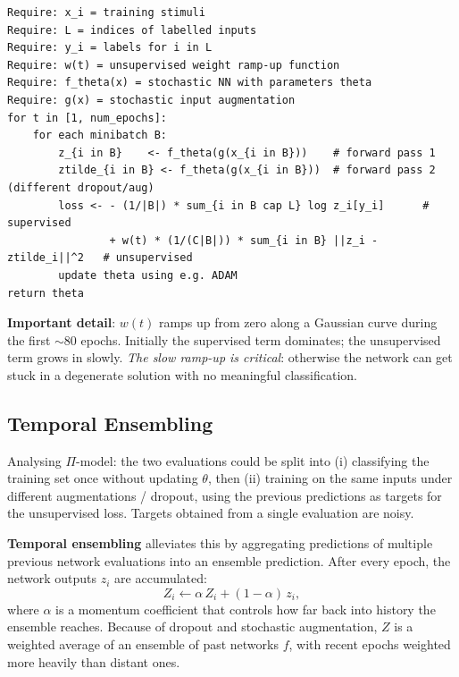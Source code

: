 \documentclass[11pt,a4paper]{article}
\theoremstyle{definition}
\theoremstyle{plain}
\theoremstyle{remark}
\begin{document}
\begin{tcolorbox}[colback=gray!5!white,colframe=gray!60!black,title=\textbf{Algorithm 1: $\Pi$-Model}]
\begin{verbatim}
Require: x_i = training stimuli
Require: L = indices of labelled inputs
Require: y_i = labels for i in L
Require: w(t) = unsupervised weight ramp-up function
Require: f_theta(x) = stochastic NN with parameters theta
Require: g(x) = stochastic input augmentation
for t in [1, num_epochs]:
    for each minibatch B:
        z_{i in B}    <- f_theta(g(x_{i in B}))    # forward pass 1
        ztilde_{i in B} <- f_theta(g(x_{i in B}))  # forward pass 2 (different dropout/aug)
        loss <- - (1/|B|) * sum_{i in B cap L} log z_i[y_i]      # supervised
                + w(t) * (1/(C|B|)) * sum_{i in B} ||z_i - ztilde_i||^2   # unsupervised
        update theta using e.g. ADAM
return theta
\end{verbatim}
\end{tcolorbox}

\textbf{Important detail}: $w(t)$ ramps up from zero along a Gaussian curve during the first $\sim 80$ epochs. Initially the supervised term dominates; the unsupervised term grows in slowly. \emph{The slow ramp-up is critical}: otherwise the network can get stuck in a degenerate solution with no meaningful classification.

\subsection{Temporal Ensembling}

Analysing $\Pi$-model: the two evaluations could be split into (i) classifying the training set once without updating $\theta$, then (ii) training on the same inputs under different augmentations / dropout, using the previous predictions as targets for the unsupervised loss. Targets obtained from a single evaluation are noisy.

\textbf{Temporal ensembling} alleviates this by aggregating predictions of multiple previous network evaluations into an ensemble prediction. After every epoch, the network outputs $z_i$ are accumulated:
\begin{equation}
    Z_i \leftarrow \alpha\,Z_i + (1 - \alpha)\,z_i,
\end{equation}
where $\alpha$ is a momentum coefficient that controls how far back into history the ensemble reaches. Because of dropout and stochastic augmentation, $Z$ is a weighted average of an ensemble of past networks $f$, with recent epochs weighted more heavily than distant ones.
\end{document}
